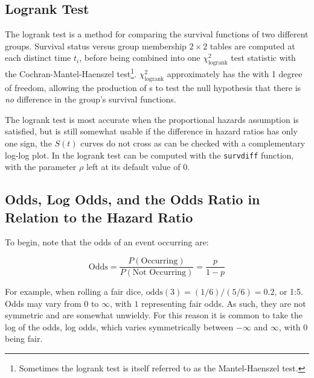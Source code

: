 \subsection{Logrank Test}
\label{survival:additional:logrank}

The logrank test is a method for comparing the survival functions of two different groups.
Survival status versus group membership $2\times2$ tables are computed at each distinct time $t_{i}$,
before being combined into one $\chi_{\text{logrank}}^{2}$ test statistic
with the Cochran-Mantel-Haenszel test\footnote{Sometimes
the logrank test is itself referred to as the Mantel-Haenszel test.}.
$\chi_{\text{logrank}}^{2}$ approximately has the \chiSqdist with 1 degree of freedom,
allowing the production of {\pvalue}s to test the null hypothesis
that there is {\em no} difference in the group's survival functions.

The logrank test is most accurate when the proportional hazards assumption is satisfied,
but is still somewhat usable if the difference in hazard ratios has only one sign,
\ie the $S\left(t\right)$ curves do not cross as can be checked with a complementary log-log plot.
In \R the logrank test can be computed with the \texttt{survdiff} function,
with the parameter $\rho$ left at its default value of $0$.

\subsection{Odds, Log Odds, and the Odds Ratio in Relation to the Hazard Ratio}
\label{survival:additional:odds}

To begin, note that the odds of an event occurring are:

\begin{equation}\label{eq:survival:odds}
\text{Odds} = \frac{P\left(\text{Occurring}\right)}{P\left(\text{Not Occurring}\right)} = \frac{p}{1-p}
\end{equation}

\noindent For example, when rolling a fair dice, $\text{odds}\left(3\right) = (1/6) / (5/6) = 0.2$, or 1:5.
Odds may vary from $0$ to $\infty$, with $1$ representing fair odds.
As such, they are not symmetric and are somewhat unwieldy.
For this reason it is common to take the log of the odds,
\ie log odds, which varies symmetrically between $-\infty$ and $\infty$, with 0 being fair.

